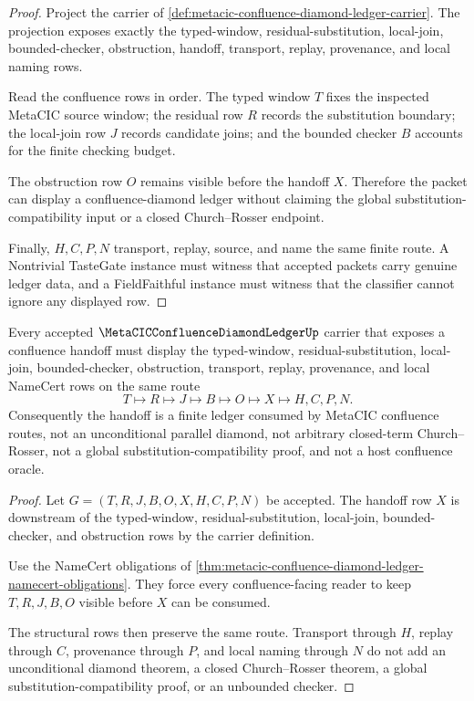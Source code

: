 \begin{proof}
Project the carrier of \autoref{def:metacic-confluence-diamond-ledger-carrier}. The projection exposes exactly the typed-window, residual-substitution, local-join, bounded-checker, obstruction, handoff, transport, replay, provenance, and local naming rows.

Read the confluence rows in order. The typed window $T$ fixes the inspected MetaCIC source window; the residual row $R$ records the substitution boundary; the local-join row $J$ records candidate joins; and the bounded checker $B$ accounts for the finite checking budget.

The obstruction row $O$ remains visible before the handoff $X$. Therefore the packet can display a confluence-diamond ledger without claiming the global substitution-compatibility input or a closed Church--Rosser endpoint.

Finally, $H,C,P,N$ transport, replay, source, and name the same finite route. A Nontrivial TasteGate instance must witness that accepted packets carry genuine ledger data, and a FieldFaithful instance must witness that the classifier cannot ignore any displayed row.
\end{proof}

\begin{theorem}
\label{thm:metacic-confluence-diamond-ledger-handoff}
Every accepted $\MetaCICConfluenceDiamondLedgerUp$ carrier that exposes a confluence handoff must display the typed-window, residual-substitution, local-join, bounded-checker, obstruction, transport, replay, provenance, and local NameCert rows on the same route
$$
T \longmapsto R \longmapsto J \longmapsto B \longmapsto O \longmapsto X \longmapsto H,C,P,N .
$$
Consequently the handoff is a finite ledger consumed by MetaCIC confluence routes, not an unconditional parallel diamond, not arbitrary closed-term Church--Rosser, not a global substitution-compatibility proof, and not a host confluence oracle.
\end{theorem}
\begin{proof}
Let $G=(T,R,J,B,O,X,H,C,P,N)$ be accepted. The handoff row $X$ is downstream of the typed-window, residual-substitution, local-join, bounded-checker, and obstruction rows by the carrier definition.

Use the NameCert obligations of \autoref{thm:metacic-confluence-diamond-ledger-namecert-obligations}. They force every confluence-facing reader to keep $T,R,J,B,O$ visible before $X$ can be consumed.

The structural rows then preserve the same route. Transport through $H$, replay through $C$, provenance through $P$, and local naming through $N$ do not add an unconditional diamond theorem, a closed Church--Rosser theorem, a global substitution-compatibility proof, or an unbounded checker.
\end{proof}

